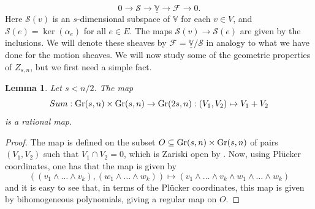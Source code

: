 \documentclass{article}
\newtheorem{lemma}[theorem]{Lemma}
\theoremstyle{definition}
\theoremstyle{remark}
\begin{document}
\begin{equation}\label{eq: les-ass}
    0 \rightarrow \mathcal{S} \rightarrow \underline{\mathbb{V}} \rightarrow \mathcal{F} \rightarrow 0. 
\end{equation}
Here $\mathcal{S}(v)$ is an $s$-dimensional subspace of $\mathbb{V}$ for each $v\in V$, and $\mathcal{S}(e) = \ker(\alpha_{e})$ for all $e\in E$. The maps $ \mathcal{S}(v) \rightarrow \mathcal{S}(e)$ are given by the inclusions. We will denote these sheaves by $\mathcal{F} = \underline{\mathbb{V}}/\mathcal{S}$ in analogy to what we have done for the motion sheaves. We will now study some of the geometric properties of $Z_{s,n}$, but we first need a simple fact. 

\begin{lemma}\label{lem: sum is rational map}
    Let $s < n/2$. The map 
    \begin{equation*}
        Sum: \textup{Gr}(s, n)\times \textup{Gr}(s, n) \rightarrow \textup{Gr}(2s, n): (V_1, V_2)\mapsto V_1 + V_2
    \end{equation*}
    is a rational map.
\end{lemma}
\begin{proof}
    The map is defined on the subset $O\subseteq\textup{Gr}(s, n)\times \textup{Gr}(s, n)$ of pairs $(V_1,V_2)$ such that $V_1\cap V_2 = 0$, which is Zariski open by . Now, using Plücker coordinates, one has that the map is given by
    \begin{equation*}
        ((v_1\wedge \dots \wedge v_k), (w_1\wedge \dots \wedge w_k))\mapsto (v_1\wedge \dots \wedge v_k \wedge w_1\wedge \dots \wedge w_k)
    \end{equation*}
    and it is easy to see that, in terms of the Plücker coordinates, this map is given by bihomogeneous polynomials, giving a regular map on $O$. 
\end{proof}
\end{document}
